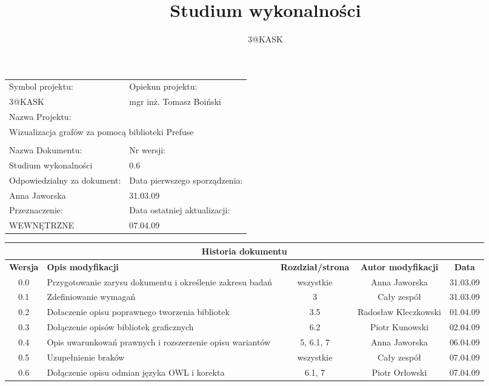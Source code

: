 \documentclass[a4paper,10pt]{article}
\title{Studium wykonalności}
\author{3@KASK}
\begin{document}



\maketitle


\begin{center}
\begin{tabular}{|p{7cm}|p{7cm}|}
\hline
Symbol projektu: & Opiekun projektu:   \tabularnewline 
3@KASK & mgr inż. Tomasz Boiński    \tabularnewline \hline
\multicolumn{2}{|l|}{Nazwa Projektu: } \tabularnewline
\multicolumn{2}{|l|}{Wizualizacja grafów za pomocą biblioteki Prefuse } \tabularnewline 
\hline
\multicolumn{2}{l}{ } \tabularnewline %
\hline 
Nazwa Dokumentu: & Nr wersji:   \tabularnewline 
Studium wykonalności & 0.6 \tabularnewline \hline
Odpowiedzialny za dokument: & Data pierwszego sporządzenia:   \tabularnewline 
Anna Jaworska & 31.03.09 \tabularnewline \hline
Przeznaczenie: & Data ostatniej aktualizacji:   \tabularnewline 
WEWNĘTRZNE & 07.04.09 \tabularnewline \hline
\end{tabular}
\end{center}

\begin{center}
\begin{tabular}{|c|p{4cm}|c|c|c|}
\multicolumn{5}{c}{\textbf{Historia dokumentu}} \tabularnewline \hline
\textbf{Wersja} & \textbf{Opis modyfikacji} & \textbf{Rozdział/strona} & \textbf{Autor modyfikacji} & \textbf{Data} \tabularnewline \hline 
0.0 & Przygotowanie zarysu dokumentu i określenie zakresu badań & wszystkie & Anna Jaworska & 31.03.09 \tabularnewline \hline
0.1 & Zdefiniowanie wymagań  & 3 & Cały zespół & 31.03.09  \tabularnewline \hline
0.2 & Dołaczenie opisu poprawnego tworzenia bibliotek & 3.5 & Radosław Kleczkowski & 01.04.09\tabularnewline \hline
0.3 & Dołączenie opisów bibliotek graficznych  & 6.2 & Piotr Kunowski & 02.04.09 \tabularnewline \hline
0.4 & Opis uwarunkowań prawnych i rozszerzenie opisu wariantów & 5, 6.1, 7 & Anna Jaworska & 06.04.09\tabularnewline \hline
0.5 & Uzupełnienie braków & wszystkie  & Cały zespół & 07.04.09 \tabularnewline \hline
0.6 & Dołączenie opisu odmian języka OWL i korekta & 6.1, 7  & Piotr Orłowski & 07.04.09 \tabularnewline \hline

\end{tabular}
 

\end{center}


\newpage
\tableofcontents
\newpage
\end{document}
